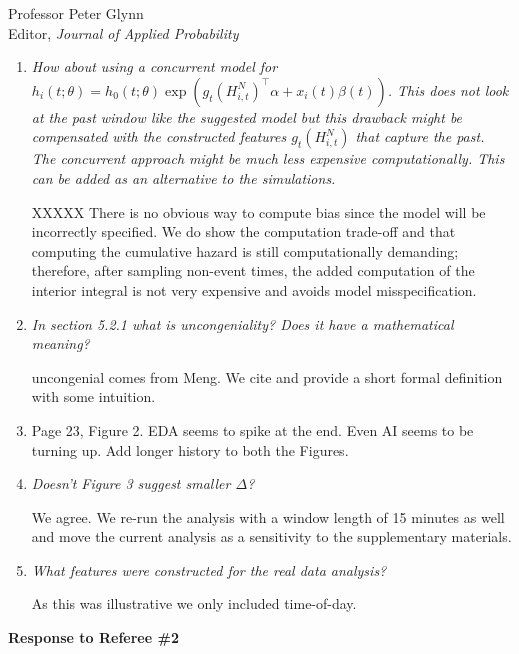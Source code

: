 \documentclass[11pt]{letter} %
\begin{document}
\begin{letter}{Professor
	Peter Glynn\\
	Editor, {\em Journal of Applied Probability}}
\begin{enumerate}
\item {\it How about using a concurrent model for $h_i (t;\theta) = h_0 (t; \theta) \exp (g_t (H_{i,t}^N)^\top \alpha + x_i (t) \beta (t))$. This does not look at the past window like the suggested model but this drawback might be compensated with the constructed features $g_t (H_{i,t}^N)$ that capture the past. The concurrent approach might be much less expensive computationally. This can be added as an alternative to the simulations.}

\vspace{5mm}
XXXXX
There is no obvious way to compute bias since the model will be incorrectly specified.  We do show the computation trade-off and that computing the cumulative hazard is still computationally demanding; therefore, after sampling non-event times, the added computation of the interior integral is not very expensive and avoids model misspecification.
\vspace{5mm}

\item {\it In section 5.2.1 what is uncongeniality? Does it have a mathematical
meaning?}

\vspace{5mm}
uncongenial comes from Meng. We cite and provide a short formal definition with some intuition.
\vspace{5mm}

\item Page 23, Figure 2. EDA seems to spike at the end. Even AI seems to be
turning up. Add longer history to both the Figures.


\item {\it Doesn’t Figure 3 suggest smaller $\Delta$?}

\vspace{5mm}
We agree.  We re-run the analysis with a window length of 15 minutes as well and move the current analysis as a sensitivity to the supplementary materials.
\vspace{5mm}

\item {\it What features were constructed for the real data analysis?}

\vspace{5mm}
As this was illustrative we only included time-of-day.
\vspace{5mm}


\end{enumerate}

\newpage

{\bf Response to Referee \#2}


\end{letter}
\end{document}
